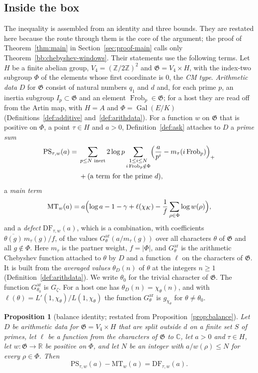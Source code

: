 \documentclass[11pt]{amsbook}
\theoremstyle{plain}
\newtheorem{proposition}[theorem]{Proposition}
\theoremstyle{definition}
\theoremstyle{remark}
\numberwithin{equation}{section}
\numberwithin{figure}{chapter}
\numberwithin{table}{chapter}
\newcommand{\Z}{\mathbb{Z}}
\newcommand{\R}{\mathbb{R}}
\renewcommand{\C}{\mathbb{C}}
\newcommand{\Gz}{G_{\zeta}}
\newcommand{\Gal}{\operatorname{Gal}}
\newcommand{\Frob}{\operatorname{Frob}}
\newcommand{\GG}{\mathfrak{G}}
\newcommand{\GPsi}{G^{\mathrm{ar}}}
\newcommand{\PS}{\mathrm{PS}}
\newcommand{\MT}{\mathrm{MT}}
\newcommand{\DF}{\mathrm{DF}}
\begin{document}
\subsection*{Inside the box}

The inequality is assembled from an identity and three bounds. They
are restated here because the route through them is the core of the
argument; the proof of Theorem~\ref{thm:main} in
Section~\ref{sec:proof-main} calls only
Theorem~\ref{bb:chebyshev-windows}. Their statements use the
following terms. Let $H$ be a finite abelian group,
$V_4=(\Z/2\Z)^2$ and $\GG=V_4\times H$, with the index-two subgroup
$\Phi$ of the elements whose first coordinate is $0$, the \emph{CM
type}. \emph{Arithmetic data} $D$ for $\GG$ consist of natural
numbers $q_1$ and $d$ and, for each prime $p$, an inertia subgroup
$I_p\subset\GG$ and an element $\Frob_p\in\GG$; for a host they are
read off from the Artin map, with $H=A$ and $\Phi=\Gal(E/K)$
(Definitions~\ref{def:additive} and~\ref{def:arithdata}). For a
function $w$ on $\GG$ that is positive on $\Phi$, a point $\tau\in H$
and $a>0$, Definition~\ref{def:ask} attaches to $D$ a \emph{prime
sum}
\[
\begin{aligned}
\PS_{\tau,w}(a)={}&\sum_{p\le N\text{ inert}}2\log p
\sum_{\substack{1\le i\le N\\ i\Frob_p\notin\Phi}}
\Bigl(\frac{a}{p^i}-m_\tau(i\Frob_p)\Bigr)_+\\
&+(\text{a term for the prime }d),
\end{aligned}
\]
a \emph{main term}
\[
\MT_w(a)=a\Bigl(\log a-1-\gamma+\ell(\chi_K)-\frac1f
\sum_{\rho\in\Phi}\log w(\rho)\Bigr),
\]
and a \emph{defect} $\DF_{\tau,w}(a)$, which is a combination, with
coefficients $\overline{\theta(g)}\,m_\tau(g)/f$, of the values
$\GPsi_\theta(a/m_\tau(g))$ over all characters $\theta$ of $\GG$ and
all $g\notin\Phi$. Here $m_\tau$ is the partner weight, $f=|\Phi|$,
and $\GPsi_\theta$ is the arithmetic Chebyshev function attached to
$\theta$ by $D$ and a function $\ell$ on the characters of $\GG$. It
is built from the \emph{averaged values} $\theta_D(n)$ of $\theta$ at
the integers $n\ge1$ (Definition~\ref{def:arithdata}). We write
$\theta_0$ for the trivial character of $\GG$. The function
$\GPsi_{\theta_0}$ is $\Gz$. For a host one has
$\theta_D(n)=\chi_\theta(n)$, and with
$\ell(\theta)=L'(1,\chi_\theta)/L(1,\chi_\theta)$ the function
$\GPsi_\theta$ is $g_{\chi_\theta}$ for $\theta\ne\theta_0$.

\begin{proposition}[balance identity; restated from
Proposition~\ref{prop:balance}]
\label{bb:balance}
Let $D$ be arithmetic data for $\GG=V_4\times H$ that are split outside
$d$ on a finite set $S$ of primes, let $\ell$ be a function from the
characters of $\GG$ to $\C$, let $a>0$ and $\tau\in H$, let
$w\colon\GG\to\R$ be positive on $\Phi$, and let $N$ be an integer
with $a/w(\rho)\le N$ for every $\rho\in\Phi$. Then
\[
\PS_{\tau,w}(a)-\MT_w(a)=\DF_{\tau,w}(a).
\]
\end{proposition}
\end{document}
